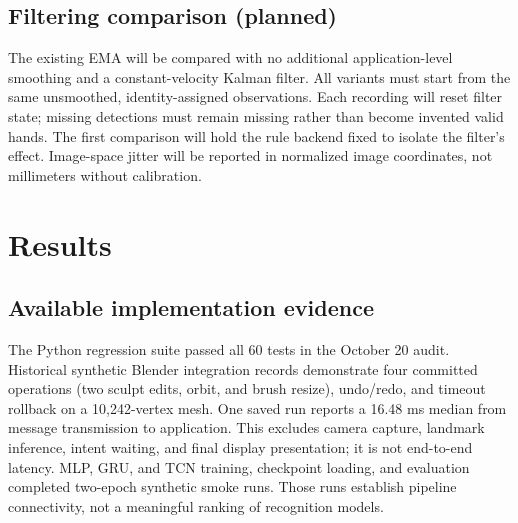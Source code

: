 \documentclass{article}
\newif\ifdraftnotes
\newcommand{\workitem}[7]{%
  \ifdraftnotes
  \begin{tcolorbox}[title={#1},title after break={#1 (continued)}]
  \textbf{Owner: }#2\par
  \textbf{Task: }#3\par
  \textbf{Protocol: }#4\par
  \textbf{Deliverables: }#5\par
  \textbf{Fill here: }#6\par
  \textbf{Done when: }#7
  \end{tcolorbox}
  \fi}
\newcommand{\code}[1]{\texttt{\detokenize{#1}}}
\begin{document}
\subsection{Filtering comparison (planned)}\label{sec:filter}
The existing EMA will be compared with no additional application-level smoothing
and a constant-velocity Kalman filter. All variants must start from the same
unsmoothed, identity-assigned observations. Each recording will reset filter state;
missing detections must remain missing rather than become invented valid hands.
The first comparison will hold the rule backend fixed to isolate the filter's
effect. Image-space jitter will be reported in normalized image coordinates,
not millimeters without calibration.

\workitem{M4 | Preserve raw inputs before comparing filters}
{D (name to be assigned); provide A/B/C with a reusable preprocessing contract on Monday.}
{Verify that \code{smoothing=1.0} disables application-level EMA. Derive None, EMA, and Kalman versions from the raw data, preserving the originals. Current record saves camera-processed points and evaluate does not automatically refilter them; add consistent offline/online preprocessing.}
{Hold raw hand identities, timestamps, validity, and labels fixed; change only coordinate processing. Reset at each recording and after long losses, and never smooth across people or sessions. Fix EMA at 0.45. Use position and velocity states per coordinate for Kalman filtering, update with actual time intervals, and choose and save Q/R on validation data only. Applying Kalman on top of EMA is not the intended same-input comparison.}
{Three derived-data manifests, parameters, and source versions; trajectory comparisons for stationary, fast-motion, and brief-occlusion intervals. Document the identity-assignment/filtering order and check numerical agreement between online and offline processing.}
{Describe Kalman states, observations, initialization, and loss handling. Complete Table~\ref{tab:ablation} and explain whether lower jitter costs more lag or more missed operations.}
{Raw recording verified Monday, Oct. 19; methods validated Wednesday, Oct. 21; results Thursday, Oct. 22. Leave unvalidated filters as planned work.}

\section{Results}
\subsection{Available implementation evidence}
The Python regression suite passed all 60 tests in the October 20 audit. Historical
synthetic Blender integration records demonstrate four committed operations
(two sculpt edits, orbit, and brush resize), undo/redo, and timeout rollback on a
10,242-vertex mesh. One saved run reports a 16.48 ms median from message transmission
to application. This excludes camera capture, landmark inference, intent waiting,
and final display presentation; it is not end-to-end latency. MLP, GRU, and TCN training,
checkpoint loading, and evaluation completed two-epoch synthetic smoke runs. Those
runs establish pipeline connectivity, not a meaningful ranking of recognition models.
\end{document}
